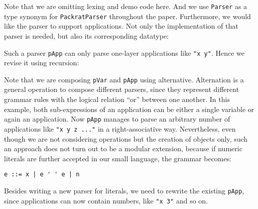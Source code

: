 Note that we are omitting lexing and demo code here. And we use \lstinline{Parser} as a type synonym for \lstinline{PackratParser} throughout the paper. Furthermore, we would like the parser to support applications.
Not only the implementation of that parser is needed, but also its corresponding datatype:


Such a parser \lstinline{pApp} can only parse one-layer applications like \lstinline{"x y"}. Hence we revise it using recursion:


Note that we are composing \lstinline{pVar} and \lstinline{pApp} using alternative. Alternation is a general operation to compose different parsers, since they represent different grammar rules with the logical relation ``or'' between one another. In this example, both sub-expressions of an application can be either a single variable or again an application. Now \lstinline{pApp} manages to parse an arbitrary number of applications like \lstinline{"x y z ..."} in a right-associative way.
Nevertheless, even though we are not considering operations but the creation of objects only, such an approach does not turn out to be a modular extension, because if numeric literals are further accepted in our small language, the grammar becomes:
\begin{lstlisting}
e ::= x | e ' ' e | n
\end{lstlisting}
Besides writing a new parser for literals, we need to rewrite the existing \lstinline{pApp}, since applications can now contain numbers, like \lstinline{"x 3"} and so on.



